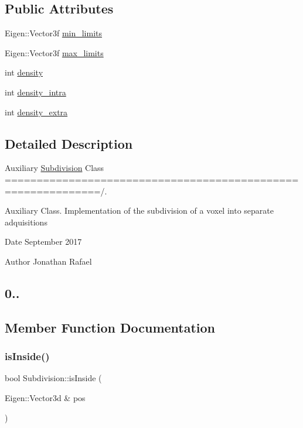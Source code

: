 \subsection*{Public Attributes}
\begin{DoxyCompactItemize}
\item 
Eigen\+::\+Vector3f \hyperlink{class_subdivision_ac8d84e208bb294b78379a05da4ccfc37}{min\+\_\+limits}
\item 
Eigen\+::\+Vector3f \hyperlink{class_subdivision_a96ca3e7e744026fef809ade08d861985}{max\+\_\+limits}
\item 
int \hyperlink{class_subdivision_a6135c9e9b9a16f2f316d28071dee16c6}{density}
\item 
int \hyperlink{class_subdivision_a2944862a3bafcacaf45a935f266f0cf0}{density\+\_\+intra}
\item 
int \hyperlink{class_subdivision_aa9d564a68a0785998db3e129c6698c0f}{density\+\_\+extra}
\end{DoxyCompactItemize}


\subsection{Detailed Description}
Auxiliary \hyperlink{class_subdivision}{Subdivision} Class =============================================================/. 

Auxiliary Class. Implementation of the subdivision of a voxel into separate adquisitions

\begin{DoxyDate}{Date}
September 2017 
\end{DoxyDate}
\begin{DoxyAuthor}{Author}
Jonathan Rafael \subsection*{0.. }
\end{DoxyAuthor}


\subsection{Member Function Documentation}
\mbox{\label{class_subdivision_adb91e1cc1e6959d13220454ddfc7ba28}} 
\subsubsection{\texorpdfstring{is\+Inside()}{isInside()}}
{\footnotesize\ttfamily bool Subdivision\+::is\+Inside (\begin{DoxyParamCaption}\item[{Eigen\+::\+Vector3d \&}]{pos }\end{DoxyParamCaption})}



